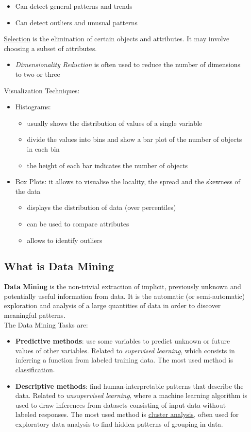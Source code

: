 \documentclass[10pt,a4paper]{article}
\begin{document}
\begin{justify}
\begin{itemize}
\begin{itemize}
			\item Can detect general patterns and trends
			\item Can detect outliers and unusual patterns
	\end{itemize}
	\uline{Selection} is the elimination of certain objects and attributes. It may involve choosing a subset of attributes.
	\begin{itemize}
		\item \textit{Dimensionality Reduction} is often used to reduce the number of dimensions to two or three
	\end{itemize}
	Visualization Techniques:
	\begin{itemize}
		\item Histograms:
		\begin{itemize}
			\item usually shows the distribution of values of a single variable
			\item divide the values into bins and show a bar plot of the number of objects in each bin
			\item  the height of each bar indicates the number of objects
\end{itemize}		 
		\item Box Plots: it allows to visualise the locality, the spread and the skewness of the data 
		\begin{itemize}
			\item displays the distribution of data (over percentiles)
			\item can be used to compare attributes
			\item allows to identify outliers
		\end{itemize}
	\end{itemize}
\end{itemize}
\subsection{What is Data Mining}
\textbf{Data Mining} is the non-trivial extraction of implicit, previously unknown and potentially useful information from data. It is the automatic (or semi-automatic) exploration and analysis of a large quantities of data in order to discover meaningful patterns. \\
The Data Mining Tasks are:
\begin{itemize}
	\item \textbf{Predictive methods}: use some variables to predict unknown or future values of other variables. Related to \textit{supervised learning}, which consists in inferring a function from labeled training data. The most used method is \uline{classification}.
	\item \textbf{Descriptive methods}: find human-interpretable patterns that describe the data. Related to \textit{unsupervised learning}, where a machine learning algorithm is used to draw inferences from datasets consisting of input data without labeled responses. The most used method is \uline{cluster analysis}, often used for exploratory data analysis to find hidden patterns of grouping in data.
\end{itemize}

\end{justify}
\end{document}
